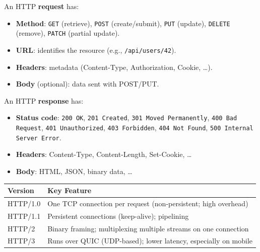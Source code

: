 \documentclass[oneside]{book}
\begin{document}
An HTTP \textbf{request} has:
\begin{itemize}
    \item \textbf{Method}: \texttt{GET} (retrieve), \texttt{POST} (create/submit),
          \texttt{PUT} (update), \texttt{DELETE} (remove), \texttt{PATCH} (partial update).
    \item \textbf{URL}: identifies the resource (e.g., \texttt{/api/users/42}).
    \item \textbf{Headers}: metadata (Content-Type, Authorization, Cookie, \ldots).
    \item \textbf{Body} (optional): data sent with POST/PUT.
\end{itemize}

An HTTP \textbf{response} has:
\begin{itemize}
    \item \textbf{Status code}: \texttt{200 OK}, \texttt{201 Created}, \texttt{301 Moved
          Permanently}, \texttt{400 Bad Request}, \texttt{401 Unauthorized},
          \texttt{403 Forbidden}, \texttt{404 Not Found}, \texttt{500 Internal Server Error}.
    \item \textbf{Headers}: Content-Type, Content-Length, Set-Cookie, \ldots
    \item \textbf{Body}: HTML, JSON, binary data, \ldots
\end{itemize}

\begin{center}
\begin{tabularx}{\linewidth}{lX}
\toprule
\textbf{Version} & \textbf{Key Feature} \\
\midrule
HTTP/1.0 & One TCP connection per request (non-persistent; high overhead) \\
HTTP/1.1 & Persistent connections (keep-alive); pipelining \\
HTTP/2   & Binary framing; multiplexing multiple streams on one connection \\
HTTP/3   & Runs over QUIC (UDP-based); lower latency, especially on mobile \\
\bottomrule
\end{tabularx}
\end{center}

\end{document}
